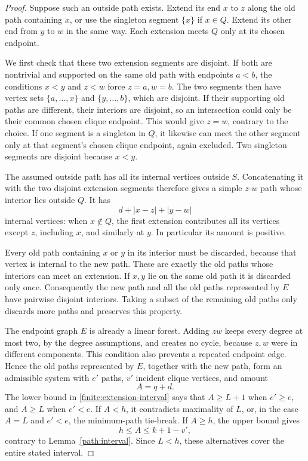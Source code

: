 \begin{proof}
Suppose such an outside path exists.  Extend its end \(x\) to \(z\)
along the old path containing \(x\), or use the singleton segment
\(\{x\}\) if \(x\in Q\).  Extend its other end from \(y\) to \(w\)
in the same way.  Each extension meets \(Q\) only at its chosen
endpoint.

We first check that these two extension segments are disjoint.
If both are nontrivial and supported on the same old path with endpoints
\(a<b\), the conditions \(x<y\) and \(z<w\) force
\(z=a,w=b\).  The two segments then have vertex sets
\(\{a,\ldots,x\}\) and \(\{y,\ldots,b\}\), which are disjoint.
If their supporting old paths are different, their interiors are
disjoint, so an intersection could only be their common chosen clique
endpoint.  This would give \(z=w\), contrary to the choice.
If one segment is a singleton in \(Q\), it likewise can meet the other
segment only at that segment's chosen clique endpoint, again excluded.
Two singleton segments are disjoint because \(x<y\).

The assumed outside path has all its internal vertices outside \(S\).
Concatenating it with the two disjoint extension segments therefore
gives a simple \(z\)-\(w\) path whose interior lies outside \(Q\).
It has
\[
 d+|x-z|+|y-w|
\]
internal vertices: when \(x\notin Q\), the first extension contributes
all its vertices except \(z\), including \(x\), and similarly at \(y\).
In particular its amount is positive.

Every old path containing \(x\) or \(y\) in its interior must be
discarded, because that vertex is internal to the new path.  These
are exactly the old paths whose interiors can meet an extension.
If \(x,y\) lie on the same old path it is discarded only once.
Consequently the new path and all the old paths represented by \(E\)
have pairwise disjoint interiors.  Taking a subset of the remaining
old paths only discards more paths and preserves this property.

The endpoint graph \(E\) is already a linear forest.  Adding \(zw\)
keeps every degree at most two, by the degree assumptions, and creates
no cycle, because \(z,w\) were in different components.  This condition
also prevents a repeated endpoint edge.  Hence the old paths
represented by \(E\), together with the new path, form an admissible
system with \(e'\) paths, \(v'\) incident clique vertices, and amount
\[
 A=q+d.
\]
The lower bound in \eqref{finite:extension-interval} says that
\(A\ge L+1\) when \(e'\ge e\), and \(A\ge L\) when \(e'<e\).
If \(A<h\), it contradicts maximality of \(L\), or, in the case
\(A=L\) and \(e'<e\), the minimum-path tie-break.
If \(A\ge h\), the upper bound gives
\[
 h\le A\le k+1-v',
\]
contrary to Lemma~\ref{path:interval}.
Since \(L<h\), these alternatives cover the entire stated interval.
\end{proof}

